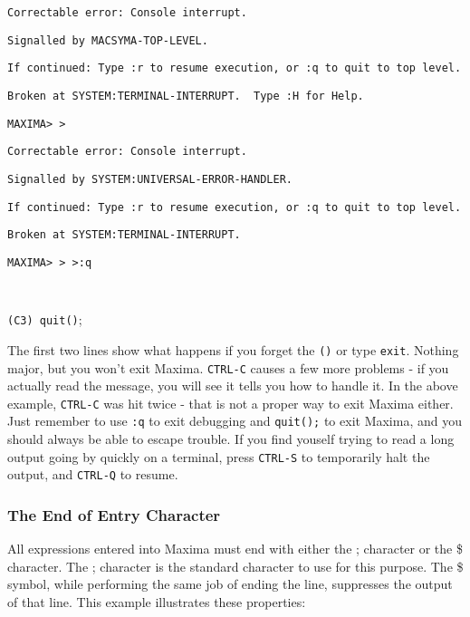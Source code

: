\texttt{Correctable error: Console interrupt.}

\texttt{Signalled by MACSYMA-TOP-LEVEL.}

\texttt{If continued: Type :r to resume execution, or :q to quit to
top level.}

\texttt{Broken at SYSTEM:TERMINAL-INTERRUPT.~ Type :H for Help.}

\texttt{MAXIMA>\,{}>}

\texttt{Correctable error: Console interrupt.}

\texttt{Signalled by SYSTEM:UNIVERSAL-ERROR-HANDLER.}

\texttt{If continued: Type :r to resume execution, or :q to quit to
top level.}

\texttt{Broken at SYSTEM:TERMINAL-INTERRUPT.}

\texttt{MAXIMA>\,{}>\,{}>:q}

\texttt{~}

\texttt{(C3) quit()};

\vspace{3ex}

The first two lines show what happens if you forget the \texttt{()}
or type \texttt{exit}. Nothing major, but you won't exit Maxima. \texttt{CTRL-C}
causes a few more problems - if you actually read the message, you
will see it tells you how to handle it. In the above example, \texttt{CTRL-C}
was hit twice - that is not a proper way to exit Maxima either. Just
remember to use \texttt{:q} to exit debugging and \texttt{quit();}
to exit Maxima, and you should always be able to escape trouble.  If you find
youself trying to read a long output going by quickly on a terminal, press 
\texttt{CTRL-S} to temporarily halt the output, and \texttt{CTRL-Q} to resume.


\subsubsection{The End of Entry Character}

All expressions entered into Maxima must end with either the ; character
or the \$ character. The ; character is the standard character to
use for this purpose. The \$ symbol, while performing
the same job of ending the line, suppresses the output of that line.
This example illustrates these properties:

\vspace{3ex}

\label{End of Entry Characters (Example 3)}

